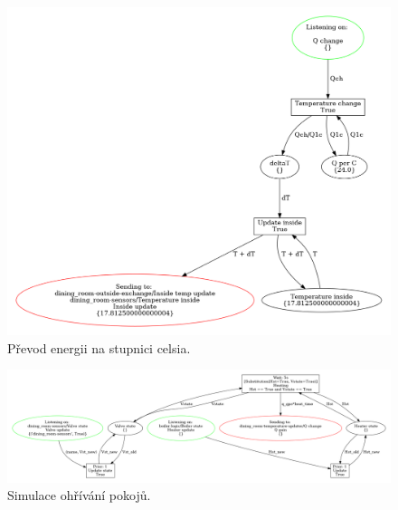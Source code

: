\begin{figure}[htb]
 \centering
 \includegraphics[width=\textwidth]{obrazky-figures/room-temp-upd.png}
 \caption{Převod energii na stupnici celsia.}
 \label{room-temp-viz}
\end{figure}

\begin{figure}[htb] %
 \centering
 \includegraphics[width=\textwidth]{obrazky-figures/room-heating.png}
 \caption{Simulace ohřívání pokojů.}
 \label{heater-viz}
\end{figure}

